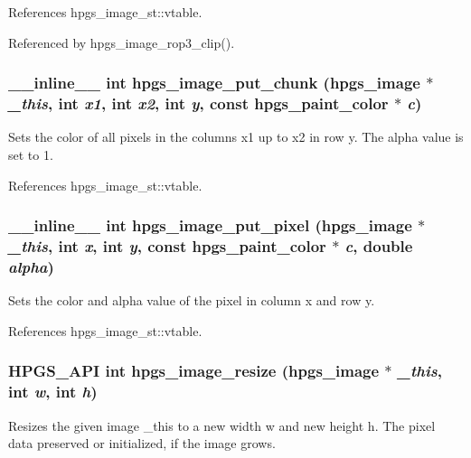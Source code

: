 References hpgs\_\-image\_\-st::vtable.



Referenced by hpgs\_\-image\_\-rop3\_\-clip().

\subsubsection[{hpgs\_\-image\_\-put\_\-chunk}]{\setlength{\rightskip}{0pt plus 5cm}\_\-\_\-inline\_\-\_\- int hpgs\_\-image\_\-put\_\-chunk ({\bf hpgs\_\-image} $\ast$ {\em \_\-this}, \/  int {\em x1}, \/  int {\em x2}, \/  int {\em y}, \/  const {\bf hpgs\_\-paint\_\-color} $\ast$ {\em c})\hspace{0.3cm}{\ttfamily  [static]}}\label{group__image_ga878871bee62b4b1a604263c4d19b7598}
Sets the color of all pixels in the columns {\ttfamily x1} up to {\ttfamily x2} in row {\ttfamily y}. The alpha value is set to 1. 

References hpgs\_\-image\_\-st::vtable.

\subsubsection[{hpgs\_\-image\_\-put\_\-pixel}]{\setlength{\rightskip}{0pt plus 5cm}\_\-\_\-inline\_\-\_\- int hpgs\_\-image\_\-put\_\-pixel ({\bf hpgs\_\-image} $\ast$ {\em \_\-this}, \/  int {\em x}, \/  int {\em y}, \/  const {\bf hpgs\_\-paint\_\-color} $\ast$ {\em c}, \/  double {\em alpha})\hspace{0.3cm}{\ttfamily  [static]}}\label{group__image_gac3e27eb47a6cb869d3d8696b08df1b55}
Sets the color and alpha value of the pixel in column {\ttfamily x} and row {\ttfamily y}. 

References hpgs\_\-image\_\-st::vtable.

\subsubsection[{hpgs\_\-image\_\-resize}]{\setlength{\rightskip}{0pt plus 5cm}HPGS\_\-API int hpgs\_\-image\_\-resize ({\bf hpgs\_\-image} $\ast$ {\em \_\-this}, \/  int {\em w}, \/  int {\em h})}\label{group__image_ga74996c0c44f726bce4d32c3260d9eb47}
Resizes the given image {\ttfamily \_\-this} to a new width {\ttfamily w} and new height {\ttfamily h}. The pixel data preserved or initialized, if the image grows. 

